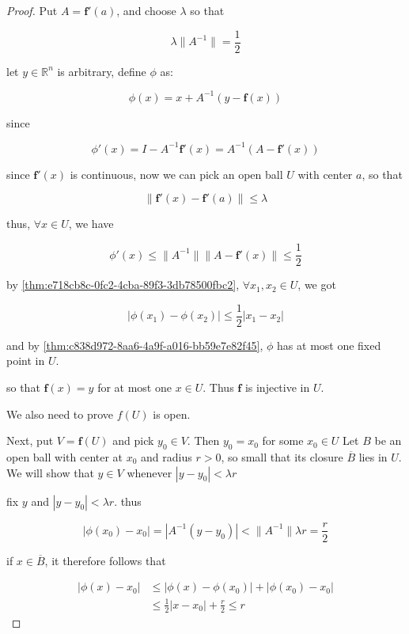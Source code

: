 \begin{proof}
    Put $A = \mathbf{f}'(a)$, and choose $\lambda $ so that 

    \[
        \lambda \| A^{-1}\| = \frac{1}{2}
    \]

   let $y \in \mathbb{R}^n$ is arbitrary, define $\phi$ as:

   \[
    \phi(x) = x + A^{-1}(y - \mathbf{f}(x))
   \]

   since 

   \[
    \phi'(x) = I - A^{-1} \mathbf{f}'(x) = A^{-1}\left( A - \mathbf{f}'(x)\right)
   \]

   since $\mathbf{f}'(x)$ is continuous, now we can pick an open ball $U$ with center $a$, so that

   \[
        \| \mathbf{f}'(x) - \mathbf{f}'(a)\| \le \lambda
   \]

   thus, $\forall x \in U$, we have

   \[
        \phi'(x) \le \| A^{-1} \| \| A - \mathbf{f}'(x) \| \le \frac{1}{2}
   \]

   by \autoref{thm:e718cb8c-0fc2-4cba-89f3-3db78500fbc2}, $\forall x_1,x_2 \in U$, we got

   \[
        \left| \phi(x_1) - \phi(x_2) \right| \le \frac{1}{2} \left| x_1 - x_2 \right|
   \]

   and by \autoref{thm:c838d972-8aa6-4a9f-a016-bb59e7e82f45}, $\phi$ has at most one fixed point in $U$.

   so that $\mathbf{f}(x) = y$ for at most one $x \in U$. Thus $\mathbf{f}$ is injective in $U$.

   We also need to prove $f(U)$ is open.

   Next, put $V = \mathbf{f}(U)$ and pick $y_0 \in V$. Then $y_0 = x_0$  for some $x_0 \in U$
   Let $B$ be an open ball with center at $x_0$ and radius $r > 0$, so small that
   its closure $\overline{B}$ lies in $U$. We will show that $y \in V$ whenever $|y-y_0| < \lambda r$

   fix $y$ and $|y-y_0 | < \lambda r$. thus

   \[
    \left|\phi(x_0) - x_0 \right| = \left| A^{-1}(y-y_0) \right| < \| A^{-1} \| \lambda r = \frac{r}{2}
   \]

   if $x \in \overline{B}$, it therefore follows that

   \begin{align*}
    \left| \phi(x) - x_0 \right|& \le \left| \phi(x) - \phi(x_0) \right| + \left| \phi(x_0) - x_0 \right| \\
    & \le \frac{1}{2} \left| x -x_0\right| + \frac{r}{2} \le r
   \end{align*}


\end{proof}
